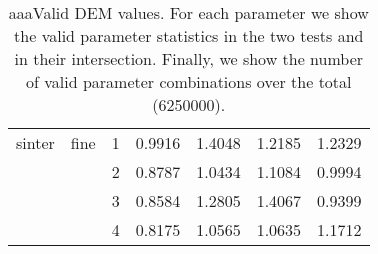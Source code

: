 \begin{table}
\begin{tabular}{ll|ccccc}
\hline 
    sinter & fine  & 1     & 0.9916 & 1.4048 & 1.2185 & 1.2329 \\
          &       & 2     & 0.8787 & 1.0434 & 1.1084 & 0.9994 \\
          &       & 3     & 0.8584 & 1.2805 & 1.4067 & 0.9399 \\
          &       & 4     & 0.8175 & 1.0565 & 1.0635 & 1.1712 \\
         \hline
\end{tabular}
\caption[aaaValid DEM values]{aaaValid DEM values. For each parameter we show
the valid parameter statistics in the two tests and in their intersection.
Finally, we show the number of valid parameter combinations over the total
(6250000).}
\label{tab:22shearcell3}
\end{table}